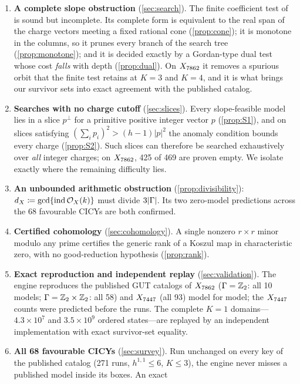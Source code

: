 \begin{enumerate}[leftmargin=*,label=\textbf{\arabic*.}]
\item \textbf{A complete slope obstruction} (\cref{sec:search}). The finite
  coefficient test of \cite{ACGLP2013} is sound but incomplete. Its complete
  form is equivalent to the real span of the charge vectors meeting a fixed
  rational cone (\cref{prop:cone}); it is monotone in the columns, so it prunes
  every branch of the search tree (\cref{prop:monotone}); and it is decided
  exactly by a Gordan-type dual test whose cost \emph{falls} with depth
  (\cref{prop:dual}). On $X_{7862}$ it removes a spurious orbit that the finite test
  retains at $K=3$ and $K=4$, and it is what brings our survivor sets into exact
  agreement with the published catalog.
\item \textbf{Searches with no charge cutoff} (\cref{sec:slices}). Every
  slope-feasible model lies in a slice $p^\perp$ for a primitive positive
  integer vector $p$ (\cref{prop:S1}), and on slices satisfying
  $(\sum_i p_i)^2>(h-1)|p|^2$ the anomaly condition bounds every charge
  (\cref{prop:S2}). Such slices can therefore be searched exhaustively over
  \emph{all} integer charges; on $X_{7862}$, 425 of 469 are proven empty. We isolate
  exactly where the remaining difficulty lies.
\item \textbf{An unbounded arithmetic obstruction} (\cref{prop:divisibility}):
  $d_X\coloneqq\gcd\{\operatorname{ind}\mathcal{O}_X(k)\}$ must divide $3|\Gamma|$. Its two
  zero-model predictions across the 68 favourable CICYs are both confirmed.
\item \textbf{Certified cohomology} (\cref{sec:cohomology}). A single nonzero
  $r\times r$ minor modulo any prime certifies the generic rank of a Koszul
  map in characteristic zero, with no good-reduction hypothesis
  (\cref{prop:rank}).
\item \textbf{Exact reproduction and independent replay}
  (\cref{sec:validation}). The engine reproduces the published GUT catalogs of
  $X_{7862}$ ($\Gamma=\mathbb{Z}_2$: all 10 models; $\Gamma=\mathbb{Z}_2\times\mathbb{Z}_2$: all 58) and $X_{7447}$
  (all 93) model for model; the $X_{7447}$ counts were predicted before the runs. The
  complete $K=1$ domains---$4.3\times 10^{7}$ and $3.5\times10^{9}$ ordered
  states---are replayed by an independent implementation with exact
  survivor-set equality.
\item \textbf{All 68 favourable CICYs} (\cref{sec:survey}). Run unchanged on
  every key of the published catalog (271 runs, $h^{1,1}\le6$, $K\le3$), the
  engine never misses a published model inside its boxes. An exact

\end{enumerate}
